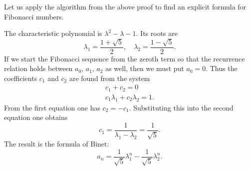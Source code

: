 Let us apply the algorithm from the above proof to find an explicit formula for Fibonacci numbers.

The characteristic polynomial is $\lambda^2 - \lambda - 1$. Its roots are
\begin{equation}
\label{eqn:FibRoots}
\lambda_1 = \frac{1 + \sqrt{5}}2, \quad \lambda_2 = \frac{1 - \sqrt{5}}2.
\end{equation}
If we start the Fibonacci sequence from the zeroth term so that the recurrence relation holds between $a_0$, $a_1$, $a_2$ as well, 
then we must put $a_0 = 0$.
Thus the coefficients $c_1$ and $c_2$ are found from the system
\begin{gather*}
c_1 + c_2 = 0\\
c_1\lambda_1 + c_2\lambda_2 = 1.
\end{gather*}
From the first equation one has $c_2 = -c_1$. Substituting this into the second equation one obtains
\[
c_1 = \frac{1}{\lambda_1 - \lambda_2} = \frac{1}{\sqrt{5}}.
\]
The result is the formula of Binet:
\[
a_n = \frac{1}{\sqrt{5}} \lambda_1^n - \frac{1}{\sqrt{5}} \lambda_2^n.
\]




